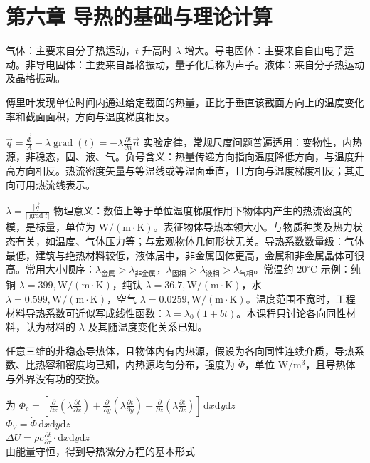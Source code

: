 \section{第六章 \quad 导热的基础与理论计算}

气体：主要来自分子热运动，$t$ 升高时 $\lambda$ 增大。导电固体：主要来自自由电子运动。非导电固体：主要来自晶格振动，量子化后称为声子。液体：来自分子热运动及晶格振动。

傅里叶发现单位时间内通过给定截面的热量，正比于垂直该截面方向上的温度变化率和截面面积，方向与温度梯度相反。

$\vec{q}=\frac{\vec{\Phi}}{A}-\lambda \operatorname{grad}(t)=-\lambda \frac{\partial t}{\partial n}\vec{n}$ 实验定律，常规尺度问题普遍适用：变物性，内热源，非稳态，固、液、气。负号含义：热量传递方向指向温度降低方向，与温度升高方向相反。热流密度矢量与等温线或等温面垂直，且方向与温度梯度相反；其走向可用热流线表示。

$\lambda =\frac{\vert \vec{q} \vert}{\vert \operatorname{grad}t\vert}$ 物理意义：数值上等于单位温度梯度作用下物体内产生的热流密度的模，是标量，单位为 $\mathrm{W/(m\cdot K)}$。表征物体导热本领大小。与物质种类及热力状态有关，如温度、气体压力等；与宏观物体几何形状无关。导热系数数量级：气体最低，建筑与绝热材料较低，液体居中，非金属固体更高，金属和非金属晶体可很高。常用大小顺序：$\lambda_{\mathrm{金属}}>\lambda_{\mathrm{非金属}}$，$\lambda_{\mathrm{固相}}>\lambda_{\mathrm{液相}}>\lambda_{\mathrm{气相}}$。常温约 $20^\circ\mathrm{C}$ 示例：纯铜 $\lambda=399,\mathrm{W/(m\cdot K)}$，纯钛 $\lambda=36.7,\mathrm{W/(m\cdot K)}$，水 $\lambda=0.599,\mathrm{W/(m\cdot K)}$，空气 $\lambda=0.0259,\mathrm{W/(m\cdot K)}$。温度范围不宽时，工程材料导热系数可近似写成线性函数：$\lambda=\lambda_0(1+bt)$。本课程只讨论各向同性材料，认为材料的 $\lambda$ 及其随温度变化关系已知。

\divider


任意三维的非稳态导热体，且物体内有内热源，假设为各向同性连续介质，导热系数、比热容和密度均已知，内热源均匀分布，强度为 $\dot{\Phi}$，单位 $\mathrm{W/m^3}$，且导热体与外界没有功的交换。

为 $\Phi_c = \left[\frac{\partial }{\partial x}\left(\lambda \frac{\partial t}{\partial x}\right)+\frac{\partial }{\partial y}\left(\lambda \frac{\partial t}{\partial y}\right)+\frac{\partial }{\partial z}\left(\lambda \frac{\partial t}{\partial z}\right)\right]\,\mathrm{d}x\mathrm{d}y\mathrm{d}z$\\
 $\Phi_V = \dot{\Phi}\, \mathrm{d}x\mathrm{d}y\mathrm{d}z$\\
 $\Delta U =\rho c \frac{\partial t}{\partial \tau}\cdot \mathrm{d}x\mathrm{d}y\mathrm{d}z$\\
由能量守恒，得到导热微分方程的基本形式

